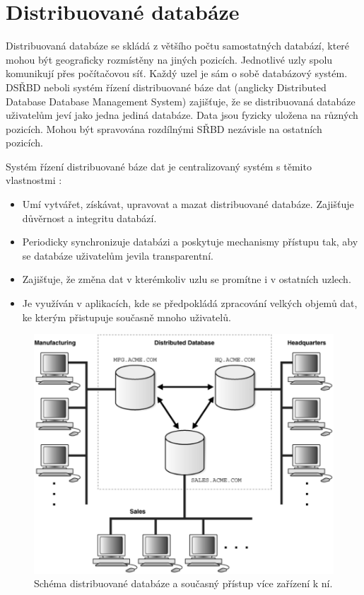 \section{Distribuované databáze}
Distribuovaná databáze se skládá z většího počtu samostatných databází, které mohou být geograficky rozmístěny na jiných pozicích. Jednotlivé uzly spolu komunikují přes počítačovou síť. Každý uzel je sám o sobě databázový systém. DSŘBD neboli systém řízení distribuované báze dat (anglicky Distributed Database Database Management System) zajišťuje, že se distribuovaná databáze uživatelům jeví jako jedna jediná databáze. Data jsou fyzicky uložena na různých pozicích. Mohou být spravována rozdílnými SŘBD nezávisle na ostatních pozicích. \cite{distributedDBMS}

Systém řízení distribuované báze dat je centralizovaný systém s těmito vlastnostmi 
\cite{distributedDBMS}:

\begin{itemize}
\item Umí vytvářet, získávat, upravovat a mazat distribuované databáze. Zajišťuje důvěrnost a integritu databází.

\item Periodicky synchronizuje databázi a poskytuje mechanismy přístupu tak, aby se databáze uživatelům jevila transparentní.

\item Zajišťuje, že změna dat v kterémkoliv uzlu se promítne i v ostatních uzlech.

\item Je využíván v aplikacích, kde se předpokládá zpracování velkých objemů dat, ke kterým přistupuje současně mnoho uživatelů.
\end{itemize}

\begin{figure}[!h]
  \centering
  \includegraphics[width=15cm]{template-fig/Distributed_database.pdf}
  \caption{Schéma distribuované databáze a současný přístup více zařízení k ní. \cite{distributedDBMSPic}}
  \label{FIG_DistrDB}
\end{figure}

